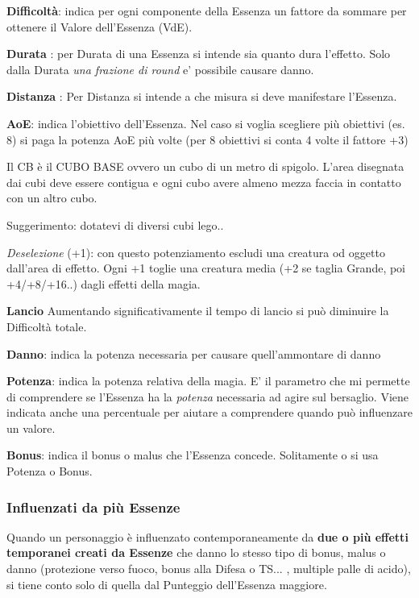 \documentclass[a4paper,twoside,openany]{book}
\begin{document}
\begin{multicols}{2}

\textbf{Difficoltà}: indica per ogni componente della Essenza un fattore da sommare per ottenere il Valore dell'Essenza (VdE).

\textbf{Durata} : per Durata di una Essenza si intende sia quanto dura l'effetto.
Solo dalla Durata \emph{una frazione di round} e' possibile causare danno.

\textbf{Distanza} : Per Distanza si intende a che misura si deve manifestare l'Essenza.

\textbf{AoE}: indica l'obiettivo dell'Essenza. Nel caso si voglia scegliere più obiettivi (es. 8) si paga la potenza AoE più volte (per 8 obiettivi si conta 4 volte il fattore +3)

Il CB è il CUBO BASE ovvero un cubo di un metro di spigolo. L'area disegnata dai cubi deve essere contigua e ogni cubo avere almeno mezza faccia in contatto con un altro cubo.

Suggerimento: dotatevi di diversi cubi lego..

\textit{Deselezione} (+1): con questo potenziamento escludi una creatura od oggetto dall'area di effetto. Ogni +1 toglie una creatura media (+2 se taglia Grande, poi +4/+8/+16..) dagli effetti della magia.

\textbf{Lancio}  
Aumentando significativamente il tempo di lancio  si può diminuire la Difficoltà totale.

\textbf{Danno}: indica la potenza necessaria per causare quell'ammontare di danno

\textbf{Potenza}: indica la potenza relativa della magia. E' il parametro che mi permette di comprendere se l'Essenza ha la \emph{potenza} necessaria ad agire sul bersaglio. Viene indicata anche una percentuale per aiutare a comprendere quando può influenzare un valore.

\textbf{Bonus}: indica il bonus o malus che l'Essenza concede. Solitamente o si usa Potenza o Bonus.

\subsubsection{Influenzati da più Essenze}

\label{influenzati-da-piu-essenze}

Quando un personaggio è influenzato contemporaneamente da \textbf{due o più effetti temporanei creati da Essenze} che danno lo stesso tipo di bonus, malus o danno (protezione verso fuoco, bonus alla Difesa o TS... , multiple palle di acido), si tiene conto solo di quella dal Punteggio dell'Essenza maggiore.



\end{multicols}
\end{document}
